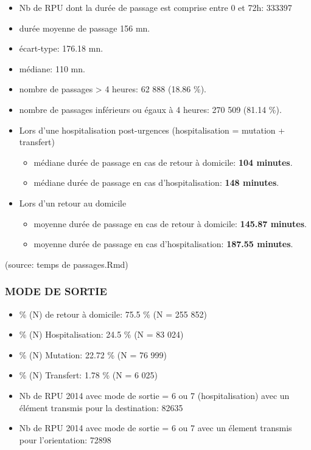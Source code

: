 \documentclass[]{article}
\begin{document}
\begin{itemize}
\item
  Nb de RPU dont la durée de passage est comprise entre 0 et 72h: 333397
\item
  durée moyenne de passage 156 mn.
\item
  écart-type: 176.18 mn.
\item
  médiane: 110 mn.
\item
  nombre de passages \textgreater{} 4 heures: 62 888 (18.86 \%).
\item
  nombre de passages inférieurs ou égaux à 4 heures: 270 509 (81.14 \%).
\item
  Lors d'une hospitalisation post-urgences (hospitalisation = mutation +
  transfert)

  \begin{itemize}
  \itemsep1pt\parskip0pt
  \item
    médiane durée de passage en cas de retour à domicile: \textbf{104
    minutes}.
  \item
    médiane durée de passage en cas d'hospitalisation: \textbf{148
    minutes}.
  \end{itemize}
\item
  Lors d'un retour au domicile

  \begin{itemize}
  \itemsep1pt\parskip0pt
  \item
    moyenne durée de passage en cas de retour à domicile: \textbf{145.87
    minutes}.
  \item
    moyenne durée de passage en cas d'hospitalisation: \textbf{187.55
    minutes}.
  \end{itemize}
\end{itemize}

(source: temps de passages.Rmd)

\subsubsection{MODE DE SORTIE}\label{mode-de-sortie}

\begin{itemize}
\itemsep1pt\parskip0pt
\item
  \% (N) de retour à domicile: 75.5 \% (N = 255 852)
\item
  \% (N) Hospitalisation: 24.5 \% (N = 83 024)
\item
  \% (N) Mutation: 22.72 \% (N = 76 999)
\item
  \% (N) Transfert: 1.78 \% (N = 6 025)
\item
  Nb de RPU 2014 avec mode de sortie = 6 ou 7 (hospitalisation) avec un
  élément transmis pour la destination: 82635
\item
  Nb de RPU 2014 avec mode de sortie = 6 ou 7 avec un élement transmis
  pour l'orientation: 72898
\end{itemize}
\end{document}
